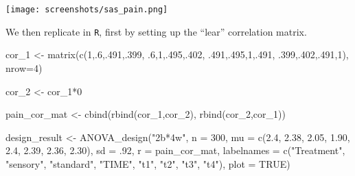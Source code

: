 \documentclass[
]{book}
\newenvironment{Shaded}{\begin{snugshade}}{\end{snugshade}}
\newcommand{\AttributeTok}[1]{\textcolor[rgb]{0.77,0.63,0.00}{#1}}
\newcommand{\ConstantTok}[1]{\textcolor[rgb]{0.00,0.00,0.00}{#1}}
\newcommand{\DecValTok}[1]{\textcolor[rgb]{0.00,0.00,0.81}{#1}}
\newcommand{\FloatTok}[1]{\textcolor[rgb]{0.00,0.00,0.81}{#1}}
\newcommand{\FunctionTok}[1]{\textcolor[rgb]{0.00,0.00,0.00}{#1}}
\newcommand{\NormalTok}[1]{#1}
\newcommand{\OtherTok}[1]{\textcolor[rgb]{0.56,0.35,0.01}{#1}}
\newcommand{\SpecialCharTok}[1]{\textcolor[rgb]{0.00,0.00,0.00}{#1}}
\newcommand{\StringTok}[1]{\textcolor[rgb]{0.31,0.60,0.02}{#1}}
\begin{document}
\texttt{[image: screenshots/sas\_pain.png]}

We then replicate in \texttt{R}, first by setting up the ``lear'' correlation matrix.

\begin{Shaded}
\begin{Highlighting}[]
\NormalTok{cor\_1 }\OtherTok{\textless{}{-}} \FunctionTok{matrix}\NormalTok{(}\FunctionTok{c}\NormalTok{(}\DecValTok{1}\NormalTok{,.}\DecValTok{6}\NormalTok{,.}\DecValTok{491}\NormalTok{,.}\DecValTok{399}\NormalTok{,}
\NormalTok{                  .}\DecValTok{6}\NormalTok{,}\DecValTok{1}\NormalTok{,.}\DecValTok{495}\NormalTok{,.}\DecValTok{402}\NormalTok{,}
\NormalTok{                  .}\DecValTok{491}\NormalTok{,.}\DecValTok{495}\NormalTok{,}\DecValTok{1}\NormalTok{,.}\DecValTok{491}\NormalTok{,}
\NormalTok{                  .}\DecValTok{399}\NormalTok{,.}\DecValTok{402}\NormalTok{,.}\DecValTok{491}\NormalTok{,}\DecValTok{1}\NormalTok{), }\AttributeTok{nrow=}\DecValTok{4}\NormalTok{)}

\NormalTok{cor\_2 }\OtherTok{\textless{}{-}}\NormalTok{ cor\_1}\SpecialCharTok{*}\DecValTok{0}

\NormalTok{pain\_cor\_mat }\OtherTok{\textless{}{-}} \FunctionTok{cbind}\NormalTok{(}\FunctionTok{rbind}\NormalTok{(cor\_1,cor\_2),}
                      \FunctionTok{rbind}\NormalTok{(cor\_2,cor\_1))}

\NormalTok{design\_result }\OtherTok{\textless{}{-}} \FunctionTok{ANOVA\_design}\NormalTok{(}\StringTok{"2b*4w"}\NormalTok{,}
                              \AttributeTok{n =} \DecValTok{300}\NormalTok{,}
                              \AttributeTok{mu =} \FunctionTok{c}\NormalTok{(}\FloatTok{2.4}\NormalTok{, }\FloatTok{2.38}\NormalTok{, }\FloatTok{2.05}\NormalTok{, }\FloatTok{1.90}\NormalTok{,}
                                     \FloatTok{2.4}\NormalTok{, }\FloatTok{2.39}\NormalTok{, }\FloatTok{2.36}\NormalTok{, }\FloatTok{2.30}\NormalTok{),}
                              \AttributeTok{sd =}\NormalTok{ .}\DecValTok{92}\NormalTok{,}
                              \AttributeTok{r =}\NormalTok{ pain\_cor\_mat,}
                              \AttributeTok{labelnames =} \FunctionTok{c}\NormalTok{(}\StringTok{"Treatment"}\NormalTok{, }\StringTok{"sensory"}\NormalTok{, }\StringTok{"standard"}\NormalTok{,}
                                             \StringTok{"TIME"}\NormalTok{, }\StringTok{"t1"}\NormalTok{, }\StringTok{"t2"}\NormalTok{, }\StringTok{"t3"}\NormalTok{, }\StringTok{"t4"}\NormalTok{),}
                              \AttributeTok{plot =} \ConstantTok{TRUE}\NormalTok{)}
\end{Highlighting}
\end{Shaded}
\end{document}
